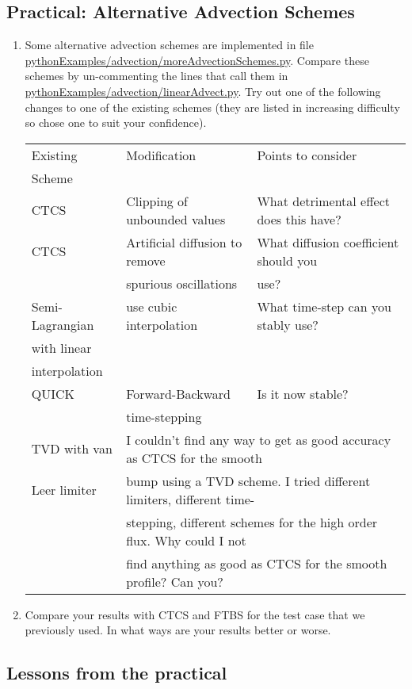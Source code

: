 \subsection{Practical: Alternative Advection Schemes}

\begin{enumerate}
\item 
Some alternative advection schemes are implemented in file \url{pythonExamples/advection/moreAdvectionSchemes.py}. Compare these schemes by un-commenting the lines that call them in \url{pythonExamples/advection/linearAdvect.py}. Try out one of the following changes to one of the existing schemes (they are listed in increasing difficulty so chose one to suit your confidence).

\begin{tabular}{l|l|l}
Existing & Modification & Points to consider \\
Scheme   &              & \\
\hline\hline
CTCS &  Clipping of unbounded values & What detrimental effect does this have?\\
\hline
CTCS &  Artificial diffusion to remove & What diffusion coefficient should you \\
  &    spurious oscillations & use?\\
\hline
Semi-Lagrangian & use cubic interpolation & What time-step can you stably use?  \\
with linear  &  & \\
interpolation &&\\
\hline
QUICK & Forward-Backward & Is it now stable? \\
      & time-stepping    & \\
\hline
TVD with van
&\multicolumn{2}{l}{I couldn't find any way to get as good accuracy as CTCS for the smooth}\\
Leer limiter&\multicolumn{2}{l}{bump using a TVD scheme. I tried different limiters, different time-}\\
&\multicolumn{2}{l}{stepping, different schemes for the high order flux. Why could I not}\\
&\multicolumn{2}{l}{find anything as good as CTCS for the smooth profile? Can you?}\\
\hline
\end{tabular}

\item Compare your results with CTCS and FTBS for the test case that we previously used. In what ways are your results better or worse. 

\end{enumerate}

\clearpage
\subsection{Lessons from the practical}
\clearpage

